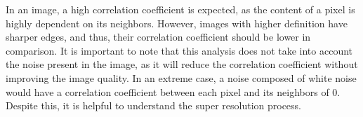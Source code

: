          In an image, a high correlation coefficient is expected, as the content of a pixel is highly dependent on its neighbors. However, images with higher definition have sharper edges, and thus, their correlation coefficient should be lower in comparison. It is important to note that this analysis does not take into account the noise present in the image, as it will reduce the correlation coefficient without improving the image quality. In an extreme case, a noise composed of white noise would have a correlation coefficient between each pixel and its neighbors of 0. Despite this, it is helpful to understand the super resolution process.
         

\clearpage

        

        
        
